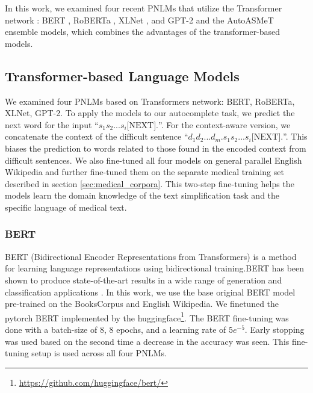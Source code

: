 \documentclass[11pt]{article}
\begin{document}
In this work, we examined four recent PNLMs that utilize the Transformer network \cite{vaswani2017attention}: BERT \cite{devlin2018bert}, RoBERTa \cite{liu2019roberta}, XLNet \cite{yang2019xlnet}, and GPT-2 \cite{radford2019language} and the AutoASMeT ensemble models, which combines the advantages of the transformer-based models.

\subsection{Transformer-based Language Models}


We examined four PNLMs based on Transformers network: BERT, RoBERTa, XLNet, GPT-2. To apply the models to our autocomplete task, we predict the next word for the input ``$s_1 s_2 ... s_i \mbox{[NEXT]} .$''. For the context-aware version, we concatenate the context of the difficult sentence
``$d_1 d_2 ... d_m. s_1 s_2 ... s_i \mbox{[NEXT]} .$''. This biases the prediction to words related to those found in the encoded context from difficult sentences. We also fine-tuned all four models on general parallel English Wikipedia \cite{kauchak2013improving} and further fine-tuned them on the separate medical training set described in section \ref{sec:medical_corpora}. This two-step fine-tuning helps the models learn the domain knowledge of the text simplification task and the specific language of medical text.

\subsubsection{BERT} 

BERT (Bidirectional Encoder Representations from Transformers) is a method for learning language representations using bidirectional training.BERT has been shown to produce state-of-the-art results in a wide range of generation and classification applications \cite{devlin2018bert}. In this work, we use the base original BERT model pre-trained on the BooksCorpus \cite{zhu2015aligning} and English Wikipedia. We finetuned the pytorch BERT implemented by the huggingface\footnote{\url{https://github.com/huggingface/bert/}}. The BERT fine-tuning was done with a batch-size of 8, 8 epochs, and a learning rate of $5e^{-5}$. Early stopping was used based on the second time a decrease in the accuracy was seen. This fine-tuning setup is used across all four PNLMs.
\end{document}
